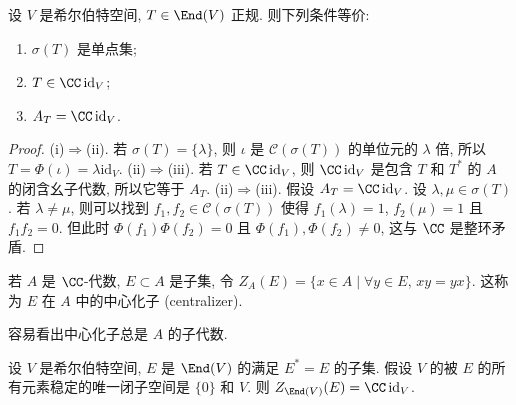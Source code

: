 \begin{corollary}[谱为单点集的条件]
\label{cor:II.4.2}
设 $V$ 是希尔伯特空间, $T \in \End(V)$ 正规. 则下列条件等价:
\begin{enumerate}
\item[(i)] $\sigma(T)$ 是单点集;
\item[(ii)] $T \in \CC\,\mathrm{id}_V$;
\item[(iii)] $A_T = \CC\,\mathrm{id}_V$.
\end{enumerate}
\end{corollary}

\begin{proof}
(i)$\Rightarrow$(ii). 若 $\sigma(T) = \{\lambda\}$, 则 $\iota$ 是 $\mathcal{C}(\sigma(T))$ 的单位元的 $\lambda$ 倍, 所以 $T = \Phi(\iota) = \lambda\mathrm{id}_V$.
(ii)$\Rightarrow$(iii). 若 $T \in \CC\,\mathrm{id}_V$, 则 $\CC\,\mathrm{id}_V$ 是包含 $T$ 和 $T^*$ 的 $A$ 的闭含幺子代数, 所以它等于 $A_T$.
(ii)$\Rightarrow$(iii). 假设 $A_T = \CC\,\mathrm{id}_V$. 设 $\lambda, \mu \in \sigma(T)$. 若 $\lambda \neq \mu$, 则可以找到 $f_1, f_2 \in \mathcal{C}(\sigma(T))$ 使得 $f_1(\lambda) = 1$, $f_2(\mu) = 1$ 且 $f_1f_2 = 0$. 但此时 $\Phi(f_1)\Phi(f_2) = 0$ 且 $\Phi(f_1), \Phi(f_2) \neq 0$, 这与 $\CC$ 是整环矛盾.
\end{proof}

\begin{definition}
\label{def:II.4.3}
若 $A$ 是 $\CC$-代数, $E \subset A$ 是子集, 令 $Z_A(E) = \{x \in A \mid \forall y \in E,\, xy = yx\}$. 这称为 $E$ 在 $A$ 中的中心化子 (centralizer).
\end{definition}

容易看出中心化子总是 $A$ 的子代数.

\begin{corollary}[不可约作用下的中心化子]
\label{cor:II.4.4}
设 $V$ 是希尔伯特空间, $E$ 是 $\End(V)$ 的满足 $E^* = E$ 的子集. 假设 $V$ 的被 $E$ 的所有元素稳定的唯一闭子空间是 $\{0\}$ 和 $V$. 则 $Z_{\End(V)}(E) = \CC\,\mathrm{id}_V$.
\end{corollary}


